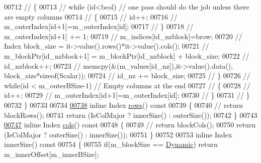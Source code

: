 \begin{DoxyCode}
00712 \textcolor{comment}{//      \{}
00713 \textcolor{comment}{//        while (id<bcol) // one pass should do the job unless there are empty columns}
00714 \textcolor{comment}{//        \{}
00715 \textcolor{comment}{//          id++;}
00716 \textcolor{comment}{//          m\_outerIndex[id+1]=m\_outerIndex[id];}
00717 \textcolor{comment}{//        \}}
00718 \textcolor{comment}{//        m\_outerIndex[id+1] += 1;}
00719 \textcolor{comment}{//        m\_indices[id\_nzblock]=brow;}
00720 \textcolor{comment}{//        Index block\_size = it->value().rows()*it->value().cols();}
00721 \textcolor{comment}{//        m\_blockPtr[id\_nzblock+1] = m\_blockPtr[id\_nzblock] + block\_size;}
00722 \textcolor{comment}{//        id\_nzblock++;}
00723 \textcolor{comment}{//        memcpy(&(m\_values[id\_nz]),it->value().data(), block\_size*sizeof(Scalar));}
00724 \textcolor{comment}{//        id\_nz += block\_size;}
00725 \textcolor{comment}{//      \}}
00726 \textcolor{comment}{//      while(id < m\_outerBSize-1) // Empty columns at the end}
00727 \textcolor{comment}{//      \{}
00728 \textcolor{comment}{//        id++;}
00729 \textcolor{comment}{//        m\_outerIndex[id+1]=m\_outerIndex[id];}
00730 \textcolor{comment}{//      \}}
00731 \textcolor{comment}{//      \}}
00732     \}
00733 
00734 
\hyperlink{group___sparse_core___module_a89c2e0b48b6425c4828a794f4c654796}{00738}     \textcolor{keyword}{inline} Index \hyperlink{group___sparse_core___module_a89c2e0b48b6425c4828a794f4c654796}{rows}()\textcolor{keyword}{ const}
00739 \textcolor{keyword}{    }\{
00740 \textcolor{comment}{//      return blockRows();}
00741       \textcolor{keywordflow}{return} (IsColMajor ? innerSize() : outerSize());
00742     \}
00743 
\hyperlink{group___sparse_core___module_aa689bd28af9a8176d1c793c075aa0a42}{00747}     \textcolor{keyword}{inline} Index \hyperlink{group___sparse_core___module_aa689bd28af9a8176d1c793c075aa0a42}{cols}()\textcolor{keyword}{ const}
00748 \textcolor{keyword}{    }\{
00749 \textcolor{comment}{//      return blockCols();}
00750       \textcolor{keywordflow}{return} (IsColMajor ? outerSize() : innerSize());
00751     \}
00752 
00753     \textcolor{keyword}{inline} Index innerSize()\textcolor{keyword}{ const}
00754 \textcolor{keyword}{    }\{
00755       \textcolor{keywordflow}{if}(m\_blockSize == \hyperlink{namespace_eigen_ad81fa7195215a0ce30017dfac309f0b2}{Dynamic}) \textcolor{keywordflow}{return} m\_innerOffset[m\_innerBSize];

\end{DoxyCode}
